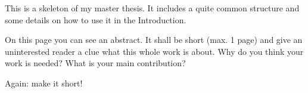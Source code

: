 This is a skeleton of my master thesis.
It includes a quite common structure and some details on how to use it in the Introduction.

On this page you can see an abstract.
It shall be short (max. 1 page) and give an uninterested reader a clue what this whole work is about.
Why do you think your work is needed?
What is your main contribution?

Again: make it short!

